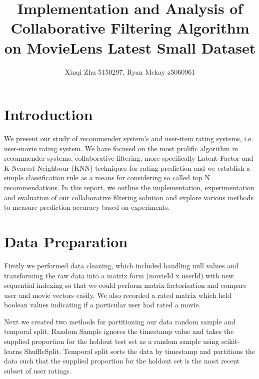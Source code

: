 \documentclass[12pt]{article}
\title{Implementation and Analysis of Collaborative Filtering Algorithm on MovieLens Latest Small Dataset}
\author{Xinqi Zhu 5150297, Ryan Mckay z5060961}
\begin{document}
 

\maketitle

\section{Introduction}

We present our study of recommender system's and user-item rating systems, i.e. user-movie rating system. We have focused on the most prolific algorithm in recommender systems, collaborative filtering, more specifically Latent Factor and K-Nearest-Neighbour (KNN) techniques for rating prediction and we establish a simple classification rule as a means for considering so called top N recommendations. In this report, we outline the implementation, experimentation and evaluation of our collaborative filtering solution and explore various methods to measure prediction accuracy based on experiments. 

%



\section{Data Preparation}

Firstly we performed data cleaning, which included handling null values and transforming the raw data into a matrix form (movieId x userId) with new sequential indexing so that we could perform matrix factorisation and compare user and movie vectors easily. We also recorded a rated matrix which held boolean values indicating if a particular user had rated a movie.

Next we created two methods for partitioning our data random sample and temporal split. Random Sample ignores the timestamp value and takes the supplied proportion for the holdout test set as a random sample using scikit-learns ShuffleSplit. Temporal split sorts the data by timestamp and partitions the data such that the supplied proportion for the holdout set is the most recent subset of user ratings. 
\end{document}
